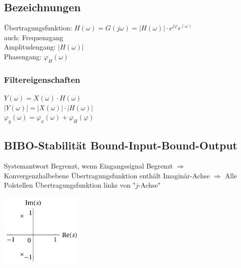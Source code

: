 \begin{minipage}{0.6\textwidth}


    \subsection{Bezeichnungen}
    Übertragungsfunktion: $H(\omega) = G(j\omega) =|H(\omega)| \cdot e^{j\varphi_H(\omega)}$ \\
    {\tiny auch: Frequenzgang}\\
    Amplitudengang: $|H(\omega)|$ \\
    Phasengang: $\varphi_H(\omega)$ \\

    \subsubsection{Filtereigenschaften}
    $Y(\omega) = X(\omega) \cdot H(\omega)$ \\
    $|Y(\omega)| = |X(\omega)| \cdot |H(\omega)|$ \\
    $\varphi_y(\omega) = \varphi_x(\omega) + \varphi_H(\varphi)$

    \subsection{BIBO-Stabilität \tiny {Bound-Input-Bound-Output}}

    Systemantwort Begrenzt, wenn Eingangssignal Begrenzt
    \newline $\Rightarrow$ Konvergenzhalbebene Übertragungsfunktion enthält Imaginär-Achse
    \newline $\Rightarrow$ Alle Polstellen Übertragungsfunktion links von "$j$-Achse"
    \begin{center}
        \includegraphics[width = 4cm]{include/Integraltransformationen/img/BiBo.png}
    \end{center}

\end{minipage}%
